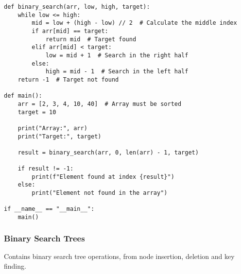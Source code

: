 \documentclass[a4paper,12pt]{article}
\begin{document}
\begin{lstlisting}[style=pythonstyle, caption={Binary Search (Python)}]
def binary_search(arr, low, high, target):
    while low <= high:
        mid = low + (high - low) // 2  # Calculate the middle index
        if arr[mid] == target:
            return mid  # Target found
        elif arr[mid] < target:
            low = mid + 1  # Search in the right half
        else:
            high = mid - 1  # Search in the left half
    return -1  # Target not found

def main():
    arr = [2, 3, 4, 10, 40]  # Array must be sorted
    target = 10

    print("Array:", arr)
    print("Target:", target)

    result = binary_search(arr, 0, len(arr) - 1, target)

    if result != -1:
        print(f"Element found at index {result}")
    else:
        print("Element not found in the array")

if __name__ == "__main__":
    main()    
\end{lstlisting}

\newpage

\subsubsection{Binary Search Trees}

Contains binary search tree operations, from node insertion, deletion and key finding.
\end{document}
